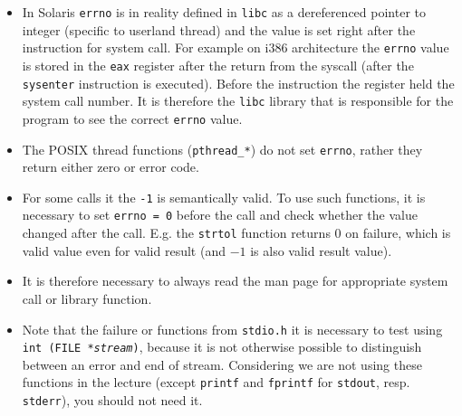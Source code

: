 \begin{itemize}
\item \label{ERRNO} In Solaris \texttt{errno} is in reality defined in
\texttt{libc} as a dereferenced pointer to integer (specific to userland thread)
and the value is set right after the instruction for system call.
For example on i386 architecture the \texttt{errno} value is stored in the
\texttt{eax} register after the return from the syscall (after the
\texttt{sysenter} instruction is executed). Before the instruction the register
held the system call number. It is therefore the \texttt{libc} library that is
responsible for the program to see the correct \texttt{errno} value.
\item The POSIX thread functions (\texttt{pthread\_*}) do not set
\texttt{errno}, rather they return either zero or error code.
\item For some calls it the \texttt{-1} is semantically valid. To use such
functions, it is necessary to set \texttt{errno~=~0} before the call and check
whether the value changed after the call. E.g. the \texttt{strtol} function
returns 0 on failure, which is valid value even for valid result
(and $-1$ is also valid result value).
\item It is therefore necessary to always read the man page for appropriate
system call or library function.
\item Note that the failure or functions from \texttt{stdio.h} it is necessary
to test using\\
\texttt{int (FILE *\emph{stream})}, because it is not otherwise
possible to distinguish between an error and end of stream. Considering we are
not using these functions in the lecture (except 
\texttt{printf} and \texttt{fprintf} for \texttt{stdout}, resp.
\texttt{stderr}), you should not need it.
\end{itemize}


